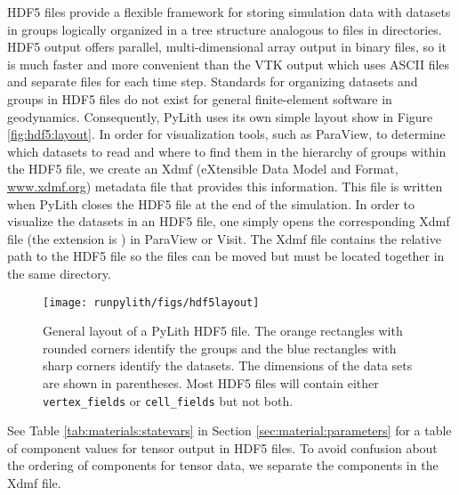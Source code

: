 \begin{inventory}
HDF5 files provide a flexible framework for storing simulation data
with datasets in groups logically organized in a tree structure analogous
to files in directories. HDF5 output offers parallel, multi-dimensional
array output in binary files, so it is much faster and more convenient
than the VTK output which uses ASCII files and separate files for
each time step. Standards for organizing datasets and groups in HDF5
files do not exist for general finite-element software in geodynamics.
Consequently, PyLith uses its own simple layout show in Figure \vref{fig:hdf5:layout}.
In order for visualization tools, such as ParaView, to determine which
datasets to read and where to find them in the hierarchy of groups
within the HDF5 file, we create an Xdmf (eXtensible Data Model and
Format, \url{www.xdmf.org}) metadata file that provides this information.
This file is written when PyLith closes the HDF5 file at the end of
the simulation. In order to visualize the datasets in an HDF5 file,
one simply opens the corresponding Xdmf file (the extension is )
in ParaView or Visit. The Xdmf file contains the relative path to
the HDF5 file so the files can be moved but must be located together
in the same directory. 


\begin{figure}[htbp]
  \texttt{[image: runpylith/figs/hdf5layout]}
  \caption{General layout of a PyLith HDF5 file. The orange rectangles
    with rounded corners identify the groups and the blue rectangles
    with sharp corners identify the datasets. The dimensions of the
    data sets are shown in parentheses. Most HDF5 files will contain
    either \texttt{vertex\_fields} or \texttt{cell\_fields} but not
    both.}
 \label{fig:hdf5:layout}
\end{figure}

See Table \vref{tab:materials:statevars} in Section
\vref{sec:material:parameters} for a table of component values for
tensor output in HDF5 files. To avoid confusion about the ordering of
components for tensor data, we separate the components in the Xdmf
file.


\end{inventory}
